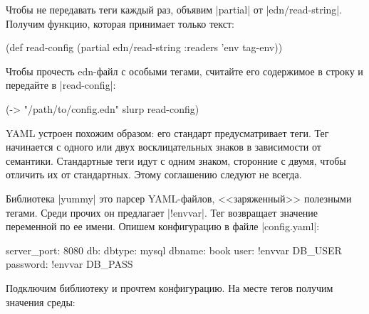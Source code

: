 \begin{english}
  \begin{clojure}
(require '[clojure.edn :as edn])

(edn/read-string
 {:readers {'env tag-env}}
 "{:db-password #env DB_PASS}")

;; {:db-password "*(&fd}A53z#$!"}
  \end{clojure}
\end{english}

Чтобы не передавать теги каждый раз, объявим \spverb|partial| от
\spverb|edn/read-string|. Получим функцию, которая принимает только текст:

\begin{english}
  \begin{clojure}
(def read-config
  (partial edn/read-string
           {:readers {'env tag-env}}))
  \end{clojure}
\end{english}

Чтобы прочесть edn-файл с особыми тегами, считайте его содержимое в строку и
передайте в \spverb|read-config|:

\begin{english}
  \begin{clojure}
(-> "/path/to/config.edn"
    slurp
    read-config)
  \end{clojure}
\end{english}

YAML устроен похожим образом: его стандарт предусматривает теги. Тег начинается
с одного или двух восклицательных знаков в зависимости от семантики. Стандартные
теги идут с одним знаком, сторонние с двумя, чтобы отличить их от
стандартных. Этому соглашению следуют не всегда.

Библиотека \spverb|yummy| это парсер YAML-файлов, <<заряженный>> полезными
тегами. Среди прочих он предлагает \spverb|!envvar|. Тег возвращает значение
переменной по ее имени. Опишем конфигурацию в файле \spverb|config.yaml|:

\begin{english}
  \begin{yaml}
server_port: 8080
db:
  dbtype:   mysql
  dbname:   book
  user:     !envvar DB_USER
  password: !envvar DB_PASS
  \end{yaml}
\end{english}

Подключим библиотеку и прочтем конфигурацию. На месте тегов получим значения
среды:

\begin{english}
  \begin{clojure}
(require '[yummy.config :as yummy])
(yummy/load-config {:path "config.yaml"})

{:server_port 8080
 :db {:dbtype "mysql"
      :dbname "book"
      :user "ivan"
      :password "*(&fd}A53z#$!"}}
  \end{clojure}
\end{english}

